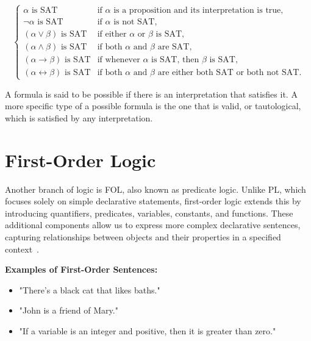 \[
\left\{
\begin{array}{ll}
    \alpha \text{ is SAT}  & \text{if } \alpha \text{ is a proposition and its interpretation is true}, \\
    \neg \alpha \text{ is SAT} & \text{if } \alpha \text{ is not SAT,} \\
    (\alpha \lor \beta) \text{ is SAT} & \text{if either } \alpha \text{ or } \beta \text{ is SAT,} \\
    (\alpha \land \beta) \text{ is SAT} & \text{if both } \alpha \text{ and } \beta \text{ are SAT,} \\
    (\alpha \rightarrow \beta) \text{ is SAT} & \text{if whenever } \alpha \text{ is SAT, then } \beta \text{ is SAT,} \\
    (\alpha \leftrightarrow \beta) \text{ is SAT} & \text{if both } \alpha \text{ and } \beta \text{ are either both SAT or both not SAT.}
\end{array}
\right.
\]

A formula is said to be possible if there is an interpretation that satisfies it. A more specific type of a possible formula is the one that is valid, or tautological, which is satisfied by any interpretation.

\section{First-Order Logic}
\label{chap:fol}
Another branch of logic is \gls{FOL}, also known as predicate logic. Unlike \gls{PL}, which focuses solely on simple declarative statements, first-order logic extends this by introducing quantifiers, predicates, variables, constants, and functions. These additional components allow us to express more complex declarative sentences, capturing relationships between objects and their properties in a specified context~\cite{huth_2004_logic}.

\textbf{Examples of First-Order Sentences:}
\begin{itemize}  
    \item "There's a black cat that likes baths." 
    \item "John is a friend of Mary." 
    \item "If a variable is an integer and positive, then it is greater than zero." 
\end{itemize}  

